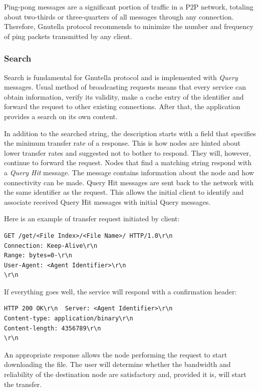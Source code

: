 Ping-pong messages are a significant portion of traffic in a P2P network,
totaling about two-thirds or three-quarters of all messages through any
connection. Therefore, Gnutella protocol recommends to minimize the number
and frequency of ping packets transmitted by any client.

\subsubsection{Search}

Search is fundamental for Gnutella protocol and is implemented with
\textit{Query} messages. Usual method of broadcasting requests means that
every service can obtain information, verify its validity, make a cache entry
of the identifier and forward the request to other existing connections. After
that, the application provides a search on its own content.

In addition to the searched string, the description starts with a field that
specifies the minimum transfer rate of a response. This is how nodes are
hinted about lower transfer rates and suggested not to bother to respond.
They will, however, continue to forward the request. Nodes that find a matching
string respond with a \textit{Query Hit} message. The message contains
information about the node and how connectivity can be made. Query Hit
messages are sent back to the network with the same identifier as the request.
This allows the initial client to identify and associate received Query Hit
messages with initial Query messages.

Here is an example of transfer request initiated by client:

\begin{verbatim}
GET /get/<File Index>/<File Name>/ HTTP/1.0\r\n
Connection: Keep-Alive\r\n
Range: bytes=0-\r\n
User-Agent: <Agent Identifier>\r\n
\r\n
\end{verbatim}

If everything goes well, the service will respond with a confirmation header:

\begin{verbatim}
HTTP 200 OK\r\n  Server: <Agent Identifier>\r\n
Content-type: application/binary\r\n
Content-length: 4356789\r\n
\r\n
\end{verbatim}

An appropriate response allows the node performing the request to start
downloading the file. The user will determine whether the bandwidth and
reliability of the destination node are satisfactory and, provided it is, will
start the transfer.

